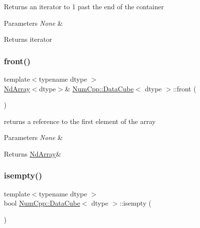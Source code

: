 Returns an iterator to 1 past the end of the container


\begin{DoxyParams}{Parameters}
{\em None} & \\
\hline
\end{DoxyParams}
\begin{DoxyReturn}{Returns}
iterator 
\end{DoxyReturn}
\mbox{\label{class_num_cpp_1_1_data_cube_ae8600af2e99651a2623b0470fd328e66}} 
\subsubsection{\texorpdfstring{front()}{front()}}
{\footnotesize\ttfamily template$<$typename dtype $>$ \\
\mbox{\hyperlink{class_num_cpp_1_1_nd_array}{Nd\+Array}}$<$dtype$>$\& \mbox{\hyperlink{class_num_cpp_1_1_data_cube}{Num\+Cpp\+::\+Data\+Cube}}$<$ dtype $>$\+::front (\begin{DoxyParamCaption}{ }\end{DoxyParamCaption})\hspace{0.3cm}{\ttfamily [inline]}}

returns a reference to the first element of the array


\begin{DoxyParams}{Parameters}
{\em None} & \\
\hline
\end{DoxyParams}
\begin{DoxyReturn}{Returns}
\mbox{\hyperlink{class_num_cpp_1_1_nd_array}{Nd\+Array}}\& 
\end{DoxyReturn}
\mbox{\label{class_num_cpp_1_1_data_cube_afe059f314921bb415ef38b637d4ba9e3}} 
\subsubsection{\texorpdfstring{isempty()}{isempty()}}
{\footnotesize\ttfamily template$<$typename dtype $>$ \\
bool \mbox{\hyperlink{class_num_cpp_1_1_data_cube}{Num\+Cpp\+::\+Data\+Cube}}$<$ dtype $>$\+::isempty (\begin{DoxyParamCaption}{ }\end{DoxyParamCaption})\hspace{0.3cm}{\ttfamily [inline]}}


